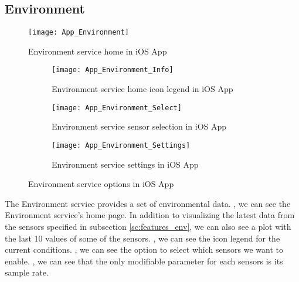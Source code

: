 \subsection{Environment}
\begin{figure}[hbt!]
	\centering
	\texttt{[image: App\_Environment]}
	\caption{Environment service home in iOS App}
	\label{fig:app_environment}
\end{figure}
\begin{figure}[hbt!]
	\centering
	\begin{subfigure}{.31\textwidth}
		\centering
		\texttt{[image: App\_Environment\_Info]}
		\caption{Environment service home icon legend in iOS App}
		\label{fig:app_environment_info}
	\end{subfigure}
	\begin{subfigure}{.31\textwidth}
		\centering
		\texttt{[image: App\_Environment\_Select]}
		\caption{Environment service sensor selection in iOS App}
		\label{fig:app_environment_select}
	\end{subfigure}
	\begin{subfigure}{.31\textwidth}
		\centering
		\texttt{[image: App\_Environment\_Settings]}
		\caption{Environment service settings in iOS App}
		\label{fig:app_environment_settings}
	\end{subfigure}
	\caption{Environment service options in iOS App}
	\label{fig:app_environment_options}
\end{figure}
The Environment service provides a set of environmental data.	, we can see the Environment service's home page. In addition to visualizing the latest data from the sensors specified in subsection \ref{sc:features_env}, we can also see a plot with the last 10 values of some of the sensors. , we can see the icon legend for the current conditions. , we can see the option to select which sensors we want to enable. , we can see that the only modifiable parameter for each sensors is its sample rate.

